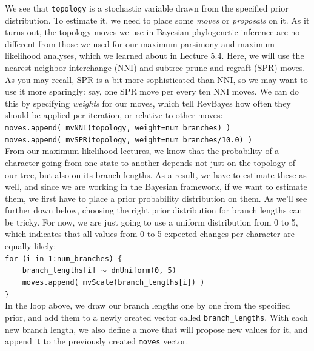 \documentclass[12pt]{article}
\begin{document}
\noindent We see that \texttt{topology} is a stochastic variable drawn from the specified prior distribution. To estimate it, we need to place some \textit{moves} or \textit{proposals} on it. As it turns out, the topology moves we use in Bayesian phylogenetic inference are no different from those we used for our maximum-parsimony and maximum-likelihood analyses, which we learned about in Lecture 5.4. Here, we will use the nearest-neighbor interchange (NNI) and subtree prune-and-regraft (SPR) moves. As you may recall, SPR is a bit more sophisticated than NNI, so we may want to use it more sparingly: say, one SPR move per every ten NNI moves. We can do this by specifying \textit{weights} for our moves, which tell RevBayes how often they should be applied per iteration, or relative to other moves: \\

\indent \texttt{moves.append( mvNNI(topology, weight=num\_branches) )} \\
\indent \texttt{moves.append( mvSPR(topology, weight=num\_branches/10.0) )} \\

\noindent From our maximum-likelihood lectures, we know that the probability of a character going from one state to another depends not just on the topology of our tree, but also on its branch lengths. As a result, we have to estimate these as well, and since we are working in the Bayesian framework, if we want to estimate them, we first have to place a prior probability distribution on them. As we'll see further down below, choosing the right prior distribution for branch lengths can be tricky. For now, we are just going to use a uniform distribution from 0 to 5, which indicates that all values from 0 to 5 expected changes per character are equally likely: \\

\indent \texttt{for (i in 1:num\_branches) \{} \\
\indent \texttt{\ \ \ \ branch\_lengths[i] {\footnotesize $\sim$} dnUniform(0, 5)} \\
\indent \texttt{\ \ \ \ moves.append( mvScale(branch\_lengths[i]) )} \\
\indent \texttt{\}} \\

\noindent In the loop above, we draw our branch lengths one by one from the specified prior, and add them to a newly created vector called \texttt{branch\_lengths}. With each new branch length, we also define a move that will propose new values for it, and append it to the previously created \texttt{moves} vector. \\
\end{document}

